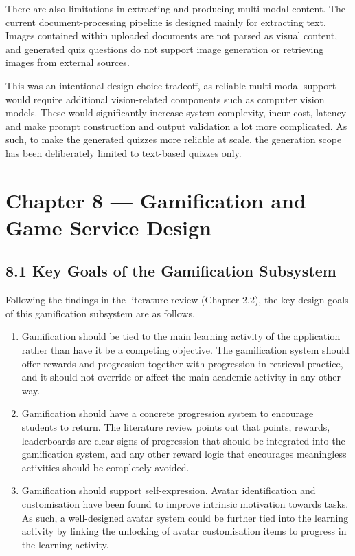 \documentclass[
  12pt,
  a4paper,
]{report}
\begin{document}
There are also limitations in extracting and producing multi-modal
content. The current document-processing pipeline is designed mainly for
extracting text. Images contained within uploaded documents are not
parsed as visual content, and generated quiz questions do not support
image generation or retrieving images from external sources.

This was an intentional design choice tradeoff, as reliable multi-modal support
would require additional vision-related components such as computer
vision models. These would significantly increase system complexity,
incur cost, latency and make prompt
construction and output validation a lot more complicated. As such, to
make the generated quizzes more reliable at scale, the generation scope
has been deliberately limited to text-based quizzes only.


\hypertarget{chapter-8-gamification-and-game-service-design}{%
\chapter{Chapter 8 --- Gamification and Game Service
Design}\label{chapter-8-gamification-and-game-service-design}}

\hypertarget{design-goals-of-the-gamification-subsystem}{%
\section{8.1 Key Goals of the Gamification
Subsystem}\label{design-goals-of-the-gamification-subsystem}}

Following the findings in the literature review (Chapter 2.2), the key
design goals of this gamification subsystem are as follows.

\begin{enumerate}
\def\labelenumi{\arabic{enumi}.}
\item
  Gamification should be tied to the main learning activity of the
  application rather than have it be a competing objective. The
  gamification system should offer rewards and progression together with
  progression in retrieval practice, and it should not override or
  affect the main academic activity in any other way.
\item
  Gamification should have a concrete progression system to encourage
  students to return. The literature review points out that points,
  rewards, leaderboards are clear signs of progression that should be
  integrated into the gamification system, and any other reward logic
  that encourages meaningless activities should be completely avoided.
\item
  Gamification should support self-expression. Avatar identification and
  customisation have been found to improve intrinsic motivation towards
  tasks. As such, a well-designed avatar system could be further tied
  into the learning activity by linking the unlocking of avatar
  customisation items to progress in the learning activity.
\end{enumerate}
\end{document}

